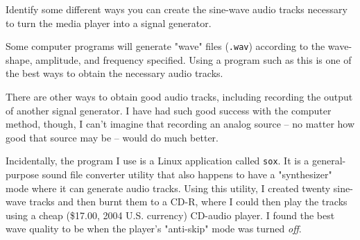 

Identify some different ways you can create the sine-wave audio tracks necessary to turn the media player into a signal generator.







Some computer programs will generate "wave" files ({\tt .wav}) according to the wave-shape, amplitude, and frequency specified.  Using a program such as this is one of the best ways to obtain the necessary audio tracks.







There are other ways to obtain good audio tracks, including recording the output of another signal generator.  I have had such good success with the computer method, though, I can't imagine that recording an analog source -- no matter how good that source may be -- would do much better.

Incidentally, the program I use is a Linux application called {\tt sox}.  It is a general-purpose sound file converter utility that also happens to have a "synthesizer" mode where it can generate audio tracks.  Using this utility, I created twenty sine-wave tracks and then burnt them to a CD-R, where I could then play the tracks using a cheap (\$17.00, 2004 U.S. currency) CD-audio player.  I found the best wave quality to be when the player's "anti-skip" mode was turned {\it off}.



